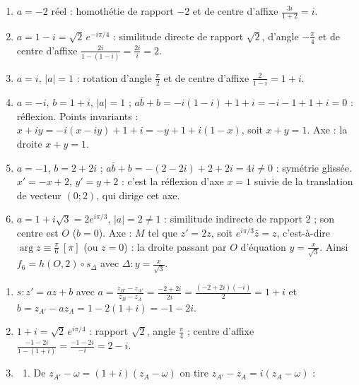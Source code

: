 \begin{corrige}
\begin{sol}
\begin{enumerate}
      \item $a = -2$ réel : homothétie de rapport $-2$ et de centre d'affixe $\frac{3i}{1+2} = i$.
      \item $a = 1 - i = \sqrt2\, e^{-i\pi/4}$ : similitude directe de rapport $\sqrt2$, d'angle $-\frac{\pi}{4}$ et de centre d'affixe $\frac{2i}{1 - (1-i)} = \frac{2i}{i} = 2$.
      \item $a = i$, $|a| = 1$ : rotation d'angle $\frac{\pi}{2}$ et de centre d'affixe $\frac{2}{1-i} = 1 + i$.
      \item $a = -i$, $b = 1 + i$, $|a| = 1$ ; $a\bar{b} + b = -i(1 - i) + 1 + i = -i - 1 + 1 + i = 0$ : réflexion.
            Points invariants : $x + iy = -i(x - iy) + 1 + i = -y + 1 + i(1 - x)$, soit $x + y = 1$. Axe : la droite $x + y = 1$.
      \item $a = -1$, $b = 2 + 2i$ ; $a\bar{b} + b = -(2 - 2i) + 2 + 2i = 4i \neq 0$ : symétrie glissée.
            $x' = -x + 2$, $y' = y + 2$ : c'est la réflexion d'axe $x = 1$ suivie de la translation de vecteur $(0;2)$, qui dirige cet axe.
      \item $a = 1 + i\sqrt3 = 2e^{i\pi/3}$, $|a| = 2 \neq 1$ : similitude indirecte de rapport $2$ ; son centre est $O$ ($b = 0$).
            Axe : $M$ tel que $z' = 2z$, soit $e^{i\pi/3}\bar{z} = z$, c'est-à-dire $\arg z \equiv \frac{\pi}{6}\ [\pi]$ (ou $z = 0$) :
            la droite passant par $O$ d'équation $y = \frac{x}{\sqrt3}$. Ainsi $f_6 = h(O,2) \circ s_{\Delta}$ avec $\Delta : y = \frac{x}{\sqrt3}$.
\end{enumerate}
\end{sol}
\begin{sol}
\begin{enumerate}
      \item $s : z' = az + b$ avec $a = \frac{z_{B'} - z_{A'}}{z_B - z_A} = \frac{-2 + 2i}{2i} = \frac{(-2+2i)(-i)}{2} = 1 + i$
            et $b = z_{A'} - a z_A = 1 - 2(1+i) = -1 - 2i$. 
      \item $1 + i = \sqrt2\, e^{i\pi/4}$ : rapport $\sqrt2$, angle $\frac{\pi}{4}$ ;
            centre d'affixe $\frac{-1-2i}{1 - (1+i)} = \frac{-1 - 2i}{-i} = 2 - i$. 
      \item \begin{enumerate}
                  \item De $z_{A'} - \omega = (1+i)(z_A - \omega)$ on tire $z_{A'} - z_A = i(z_A - \omega)$ :

\end{enumerate}
\end{enumerate}
\end{sol}
\end{corrige}
